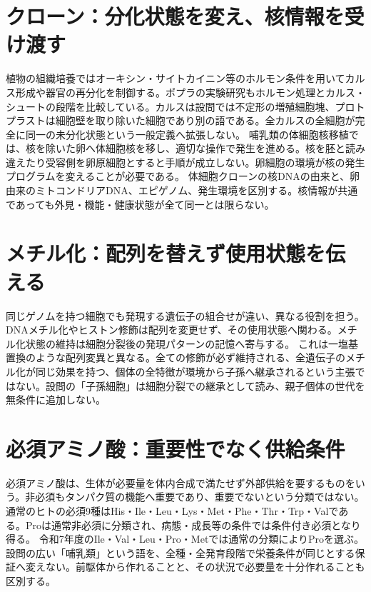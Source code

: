 \section{クローン：分化状態を変え、核情報を受け渡す}
\label{theory:biology:cloning}
植物の組織培養ではオーキシン・サイトカイニン等のホルモン条件を用いてカルス形成や器官の再分化を制御する。ポプラの実験研究もホルモン処理とカルス・シュートの段階を比較している\autocite{plant_regeneration}。カルスは設問では不定形の増殖細胞塊、プロトプラストは細胞壁を取り除いた細胞であり別の語である。全カルスの全細胞が完全に同一の未分化状態という一般定義へ拡張しない。
哺乳類の体細胞核移植では、核を除いた卵へ体細胞核を移し、適切な操作で発生を進める\autocite{nhgri_cloning}。核を胚と読み違えたり受容側を卵原細胞とすると手順が成立しない。卵細胞の環境が核の発生プログラムを変えることが必要である。
体細胞クローンの核DNAの由来と、卵由来のミトコンドリアDNA、エピゲノム、発生環境を区別する。核情報が共通であっても外見・機能・健康状態が全て同一とは限らない。

\section{メチル化：配列を替えず使用状態を伝える}
\label{theory:biology:epigenetics}
同じゲノムを持つ細胞でも発現する遺伝子の組合せが違い、異なる役割を担う。DNAメチル化やヒストン修飾は配列を変更せず、その使用状態へ関わる。メチル化状態の維持は細胞分裂後の発現パターンの記憶へ寄与する\autocite{nhgri_epigenomics}。
これは一塩基置換のような配列変異と異なる。全ての修飾が必ず維持される、全遺伝子のメチル化が同じ効果を持つ、個体の全特徴が環境から子孫へ継承されるという主張ではない。設問の「子孫細胞」は細胞分裂での継承として読み、親子個体の世代を無条件に追加しない。

\section{必須アミノ酸：重要性でなく供給条件}
\label{theory:biology:nutrition}
必須アミノ酸は、生体が必要量を体内合成で満たせず外部供給を要するものをいう。非必須もタンパク質の機能へ重要であり、重要でないという分類ではない。通常のヒトの必須9種はHis・Ile・Leu・Lys・Met・Phe・Thr・Trp・Valである。Proは通常非必須に分類され、病態・成長等の条件では条件付き必須となり得る\autocite{nih_amino}。
令和7年度のIle・Val・Leu・Pro・Metでは通常の分類によりProを選ぶ。設問の広い「哺乳類」という語を、全種・全発育段階で栄養条件が同じとする保証へ変えない。前駆体から作れることと、その状況で必要量を十分作れることも区別する。

